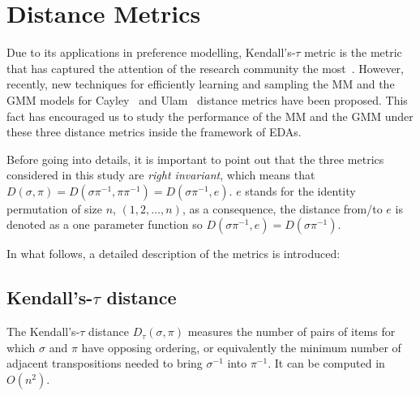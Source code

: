 \documentclass[conference]{IEEEtran}
\begin{document}
\section{Distance Metrics}\label{sec:metrics} %
Due to its applications in preference modelling, Kendall's-$\tau$ metric is the metric that has captured the attention of the research community the most~\cite{Mandhani2009,Cheng2009,Caragiannis2013}. However, recently, new techniques for efficiently learning and sampling the MM and the GMM models for Cayley~\cite{irurozki2013a} and Ulam~\cite{irurozki2013b} distance metrics have been proposed. This fact has encouraged us to study the performance of the MM and the GMM under these three distance metrics inside the framework of EDAs.


Before going into details, it is important to point out that the three metrics considered in this study are {\it right invariant}, which means that $D(\sigma, \pi) = D(\sigma\pi^{-1}, \pi\pi^{-1}) = D(\sigma\pi^{-1}, e)$. $e$ stands for the identity permutation of size $n$, $(1,2,\ldots,n)$, as a consequence, the distance from/to $e$ is denoted as a one parameter function so $D(\sigma\pi^{-1}, e)=D(\sigma\pi^{-1})$.%

In what follows, a detailed description of the metrics is introduced:

\subsection{Kendall's-$\tau$ distance} %
The Kendall's-$\tau$ distance  $D_\tau(\sigma,\pi)$ measures the number of pairs of items for which $\sigma$ and $\pi$ have opposing ordering, or equivalently the minimum number of adjacent transpositions needed to bring $\sigma^{-1}$ into $\pi^{-1}$. It can be computed in $O(n^2)$. 
\end{document}
